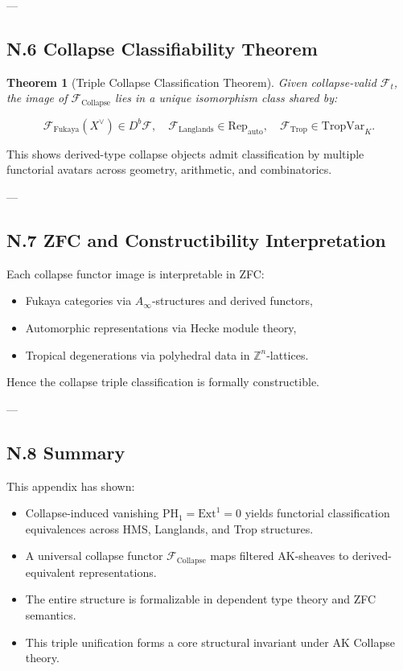 \documentclass[11pt]{article}
\newtheorem{theorem}{Theorem}[section]
\begin{document}
---

\subsection*{N.6 Collapse Classifiability Theorem}

\begin{theorem}[Triple Collapse Classification Theorem]
Given collapse-valid $\mathcal{F}_t$, the image of $\mathcal{F}_{\mathrm{Collapse}}$ lies in a unique isomorphism class shared by:

\[
\mathcal{F}_{\mathrm{Fukaya}}(X^\vee) \in D^b\mathcal{F},
\quad
\mathcal{F}_{\mathrm{Langlands}} \in \mathrm{Rep}_{\mathrm{auto}},
\quad
\mathcal{F}_{\mathrm{Trop}} \in \mathrm{TropVar}_K.
\]
\end{theorem}

This shows derived-type collapse objects admit classification by multiple functorial avatars across geometry, arithmetic, and combinatorics.

---

\subsection*{N.7 ZFC and Constructibility Interpretation}

Each collapse functor image is interpretable in ZFC:

\begin{itemize}
  \item Fukaya categories via $A_\infty$-structures and derived functors,
  \item Automorphic representations via Hecke module theory,
  \item Tropical degenerations via polyhedral data in $\mathbb{Z}^n$-lattices.
\end{itemize}

Hence the collapse triple classification is formally constructible.

---

\subsection*{N.8 Summary}

This appendix has shown:
\begin{itemize}
  \item Collapse-induced vanishing $\mathrm{PH}_1 = \mathrm{Ext}^1 = 0$ yields functorial classification equivalences across HMS, Langlands, and Trop structures.
  \item A universal collapse functor $\mathcal{F}_{\mathrm{Collapse}}$ maps filtered AK-sheaves to derived-equivalent representations.
  \item The entire structure is formalizable in dependent type theory and ZFC semantics.
  \item This triple unification forms a core structural invariant under AK Collapse theory.
\end{itemize}
\end{document}
